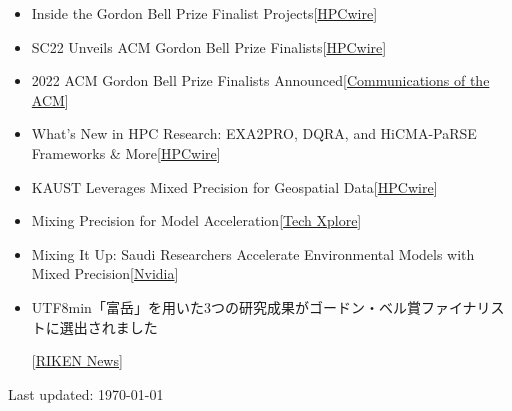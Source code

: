 \documentclass{resume} %
\let\OrigRSection\rSection
\let\OrigEndRSection\endrSection
\let\OrigMakeUppercase\MakeUppercase
\renewenvironment{rSection}[1]{
    \renewcommand{\MakeUppercase}[1]{\textcolor{blue}{\OrigMakeUppercase{##1}}}%
    \OrigRSection{#1}%
}{%
    \OrigEndRSection%
}
\begin{document}
\begin{rSection}{\faNewspaperO ~MEDIA COVERAGE}
\begin{itemize}
    \item Inside the Gordon Bell Prize Finalist Projects\hfill[\href{https://www.hpcwire.com/2022/09/07/inside-the-gordon-bell-prize-finalist-projects/}{HPCwire}]
    \item SC22 Unveils ACM Gordon Bell Prize Finalists\hfill[\href{https://www.hpcwire.com/2022/08/12/sc22-unveils-acm-gordon-bell-prize-finalists/}{HPCwire}]
    \item 2022 ACM Gordon Bell Prize Finalists Announced\hfill[\href{https://cacm.acm.org/careers/263693-2022-acm-gordon-bell-prize-finalists-announced/fulltext}{Communications of the ACM}]
    \item What’s New in HPC Research: EXA2PRO, DQRA, and HiCMA-PaRSE Frameworks \& More\hfill[\href{https://www.hpcwire.com/2022/06/28/whats-new-in-hpc-research-exa2pro-dqra-and-hicma-parse-frameworks-more/}{HPCwire}]
    \item KAUST Leverages Mixed Precision for Geospatial Data\hfill[\href{https://www.hpcwire.com/2021/07/28/kaust-leverages-mixed-precision-for-geospatial-data/}{HPCwire}]
    \item Mixing Precision for Model Acceleration\hfill[\href{https://techxplore.com/news/2021-07-precision.html}{Tech Xplore}]
    \item Mixing It Up: Saudi Researchers Accelerate Environmental Models with Mixed Precision\hfill[\href{https://blogs.nvidia.com/blog/2020/04/14/kaust-environmental-models-mixed-precision/}{Nvidia}]
    \item\begin{CJK}{UTF8}{min}「富岳」を用いた3つの研究成果がゴードン・ベル賞ファイナリストに選出されました\end{CJK}\hfill[\href{https://www.r-ccs.riken.jp/outreach/topics/20220826-1/}{RIKEN News}]
  \end{itemize}   
  
\end{rSection}

\bigskip
\begin{center}
  \begin{footnotesize}
    Last updated: \today
  \end{footnotesize}
\end{center}
\end{document}
